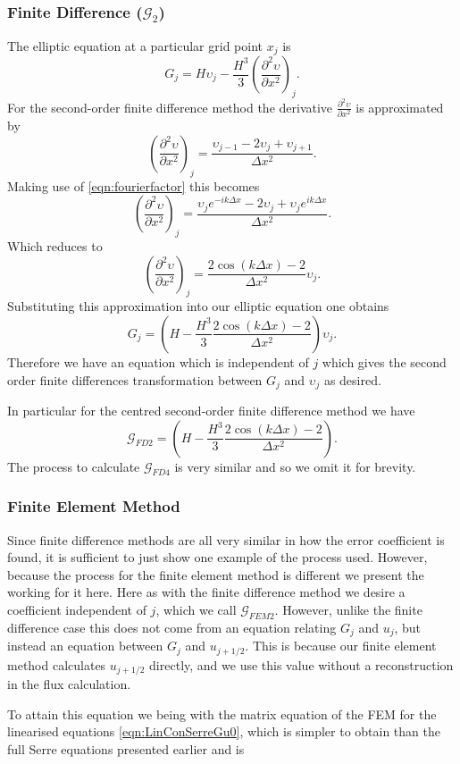 \subsubsection{Finite Difference ($\mathcal{G}_2$)}
The elliptic equation at a particular grid point $x_j$ is
\[G_j = H\upsilon_j -\frac{H^3}{3} \left(\frac{\partial^2 \upsilon}{\partial x^2}\right)_j.\]
For the second-order finite difference method the derivative $\frac{\partial^2 \upsilon}{\partial x^2}$ is approximated by   
\[ \left(\frac{\partial^2 \upsilon}{\partial x^2}\right)_j = \frac{\upsilon_{j-1} - 2\upsilon_{j} + \upsilon_{j+1}}{\Delta x^2}.\]
Making use of \eqref{eqn:fourierfactor} this becomes
\[ \left(\frac{\partial^2 \upsilon}{\partial x^2}\right)_j = \frac{\upsilon_{j} e^{-ik\Delta x} - 2\upsilon_{j} + \upsilon_{j}e^{ik\Delta x}}{\Delta x^2}.\]
Which reduces to
\[ \left(\frac{\partial^2 \upsilon}{\partial x^2}\right)_j = \frac{ 2\cos\left(k\Delta x\right) - 2 }{\Delta x^2} \upsilon_{j}.\]
Substituting this approximation into our elliptic equation one obtains
\[G_j = \left(H -\frac{H^3}{3} \frac{ 2\cos\left(k\Delta x\right) - 2 }{\Delta x^2}\right) \upsilon_{j}.\] 
Therefore we have an equation which is independent of $j$ which gives the second order finite differences transformation between $G_j$ and $\upsilon_j$ as desired. 

In particular for the centred second-order finite difference method we have
\[\mathcal{G}_{FD2} = \left(H -\frac{H^3}{3} \frac{ 2\cos\left(k\Delta x\right) - 2 }{\Delta x^2}\right).\]
The process to calculate $\mathcal{G}_{FD4}$ is very similar and so we omit it for brevity.
\subsubsection{Finite Element Method} 
Since finite difference methods are all very similar in how the error coefficient is found, it is sufficient to just show one example of the process used. However, because the process for the finite element method is different we present the working for it here. Here as with the finite difference method we desire a coefficient independent of $j$, which we call $\mathcal{G}_{FEM2}$. However, unlike the finite difference case this does not come from an equation relating $G_j$ and $u_j$, but instead an equation between $G_j$ and $u_{j+1/2}$. This is because our finite element method calculates $u_{j+1/2}$ directly, and we use this value without a reconstruction in the flux calculation.

To attain this equation we being with the matrix equation of the FEM for the linearised equations \eqref{eqn:LinConSerreGu0}, which is simpler to obtain than the full Serre equations presented earlier and is

